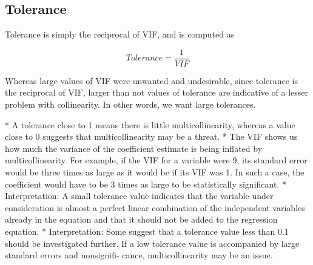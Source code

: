 





\subsection*{Tolerance}
Tolerance is simply the reciprocal of VIF, and is computed as


\[ Tolerance = \frac{1}{VIF}\]

Whereas large values of VIF were unwanted and undesirable, since tolerance is the reciprocal
of VIF, larger than not values of tolerance are indicative of a lesser problem with collinearity.
In other words, we want large tolerances.

\begin{itemize}
*  A tolerance close to 1 means there is little multicollinearity, whereas a value close to 0
suggests that multicollinearity may be a threat.
*  The VIF shows us how much the variance of the coefficient estimate is being inflated by
multicollinearity. For example, if the VIF for a variable were 9, its standard error would
be three times as large as it would be if its VIF was 1. In such a case, the coefficient
would have to be 3 times as large to be statistically significant.
*  Interpretation: A small tolerance value indicates that the variable under consideration
is almost a perfect linear combination of the independent variables already in the equation
and that it should not be added to the regression equation.
*  Interpretation: Some suggest that a tolerance value less than 0.1 should be investigated
further. If a low tolerance value is accompanied by large standard errors and nonsignifi-
cance, multicollinearity may be an issue.
\end{itemize}




